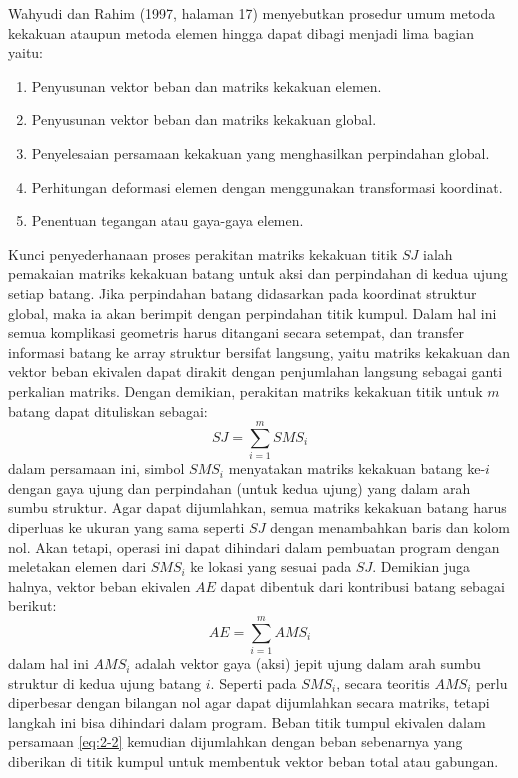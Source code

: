 Wahyudi dan Rahim (1997, halaman 17) menyebutkan prosedur umum metoda
kekakuan ataupun metoda elemen hingga dapat dibagi menjadi lima bagian
yaitu:
\begin{enumerate}[label=\arabic*.]
\item Penyusunan vektor beban dan matriks kekakuan elemen.
\item Penyusunan vektor beban dan matriks kekakuan global.
\item Penyelesaian persamaan kekakuan yang menghasilkan perpindahan global.
\item Perhitungan deformasi elemen dengan menggunakan transformasi koordinat.
\item Penentuan tegangan atau gaya-gaya elemen.
\end{enumerate}

Kunci penyederhanaan proses perakitan matriks kekakuan titik $SJ$ ialah
pemakaian matriks kekakuan batang untuk aksi dan perpindahan di kedua ujung
setiap batang. Jika perpindahan batang didasarkan pada koordinat struktur
global, maka ia akan berimpit dengan perpindahan titik kumpul. Dalam hal
ini semua komplikasi geometris harus ditangani secara setempat, dan
transfer informasi batang ke array struktur bersifat langsung, yaitu
matriks kekakuan dan vektor beban ekivalen dapat dirakit dengan penjumlahan
langsung sebagai ganti perkalian matriks. Dengan demikian, perakitan
matriks kekakuan titik untuk $m$ batang dapat dituliskan sebagai:
\begin{equation}
SJ = \sum_{i=1}^{m} SMS_i
\label{eq:2-1}
\end{equation}
dalam persamaan ini, simbol $SMS_i$ menyatakan matriks kekakuan batang
ke-$i$ dengan gaya ujung dan perpindahan (untuk kedua ujung) yang dalam
arah sumbu struktur. Agar dapat dijumlahkan, semua matriks kekakuan batang
harus diperluas ke ukuran yang sama seperti $SJ$ dengan menambahkan baris
dan kolom nol. Akan tetapi, operasi ini dapat dihindari dalam pembuatan
program dengan meletakan elemen dari $SMS_i$ ke lokasi yang sesuai pada
$SJ$. Demikian juga halnya, vektor beban ekivalen $AE$ dapat dibentuk dari
kontribusi batang sebagai berikut:
\begin{equation}
AE = \sum_{i=1}^{m} AMS_i
\label{eq:2-2}
\end{equation}
dalam hal ini $AMS_i$ adalah vektor gaya (aksi) jepit ujung dalam arah
sumbu struktur di kedua ujung batang $i$. Seperti pada $SMS_i$, secara
teoritis $AMS_i$ perlu diperbesar dengan bilangan nol agar dapat dijumlahkan
secara matriks, tetapi langkah ini bisa dihindari dalam program. Beban
titik tumpul ekivalen dalam persamaan \eqref{eq:2-2} kemudian dijumlahkan
dengan beban sebenarnya yang diberikan di titik kumpul untuk membentuk
vektor beban total atau gabungan.

